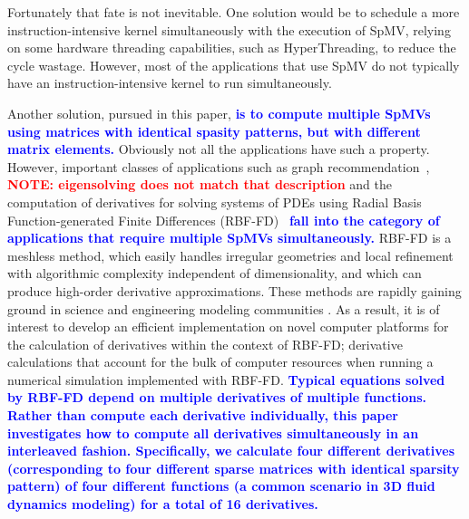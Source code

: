 \documentclass{sig-alternate}
\def\red#1{\textbf{\textcolor{red}{#1}}}
\def\blue#1{\textbf{\textcolor{blue}{#1}}}
\def\ge#1{{\blue{#1}}}
\def\NOTE#1{{\red{NOTE: #1}}}
\begin{document}
Fortunately that fate is not inevitable. One solution would be to
schedule a more instruction-intensive kernel simultaneously with the
execution of SpMV, relying on some hardware threading capabilities,
such as HyperThreading, to reduce the cycle wastage. However, most of 
the applications that use SpMV do not typically have an 
instruction-intensive kernel to run simultaneously.

Another solution, pursued in this paper, \ge{is to compute multiple SpMVs using matrices with identical spasity patterns, but with different matrix elements.}  Obviously not all the applications have such a property. However, important classes of applications such as graph recommendation~\cite{Kucuktunc13-SNAM}, \NOTE{eigensolving does not match that description} and the computation of derivatives for solving systems of PDEs using Radial Basis Function-generated Finite Differences (RBF-FD)~\cite{FLBWSC12} \ge{fall into the category of applications that require multiple SpMVs simultaneously.} RBF-FD is a meshless method, which easily handles irregular geometries and local refinement with algorithmic complexity independent of dimensionality, 
and which can produce high-order derivative approximations. These methods are rapidly gaining 
ground in science and engineering modeling communities \cite{Bayona13,CDNT,FoL11,FLBWSC12,SPLM}. 
As a result, it is of interest to develop an efficient implementation on novel computer platforms for the calculation of derivatives within the context of RBF-FD; derivative calculations that account for the bulk of computer resources when running a numerical simulation implemented with RBF-FD. 
\ge{Typical equations solved by RBF-FD depend on multiple derivatives
of multiple functions. Rather than compute each derivative individually, this paper investigates 
how to compute all derivatives simultaneously in an interleaved fashion. Specifically, 
we calculate four different derivatives (corresponding to four different sparse matrices with identical 
sparsity pattern) of four different functions
(a common scenario in 3D fluid dynamics modeling) for a total of 16 derivatives. }
\end{document}
